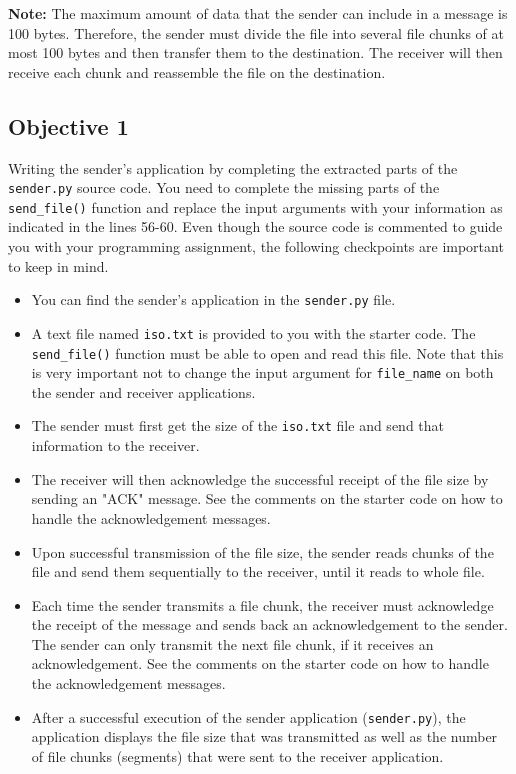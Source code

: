\documentclass[11pt]{article}
\begin{document}
\textbf{Note:}
The maximum amount of data that the sender can include in a message is 100 bytes. Therefore, the sender must divide the file into several file chunks of at most 100 bytes and then transfer them to the destination. The receiver will then receive each chunk and reassemble the file on the destination.


\subsection{Objective 1}
\label{subsec:obj1}
Writing the sender's application by completing the extracted parts of the \texttt{sender.py} source code. You need to complete the missing parts of the \texttt{send\_file()} function and replace the input arguments with your information as indicated in the lines 56-60. Even though the source code is commented to guide you with your programming assignment, the following checkpoints are important to keep in mind.
\begin{itemize}
    \item You can find the sender's application in the \texttt{sender.py} file.
    \item A text file named \texttt{iso.txt} is provided to you with the starter code. The \texttt{send\_file()} function must be able to open and read this file. Note that this is very important not to change the input argument for \texttt{file\_name} on both the sender and receiver applications.
    \item The sender must first get the size of the \texttt{iso.txt} file and send that information to the receiver.
    \item The receiver will then acknowledge the successful receipt of the file size by sending an "ACK" message. See the comments on the starter code on how to handle the acknowledgement messages.
    \item Upon successful transmission of the file size, the sender reads chunks of the file and send them sequentially to the receiver, until it reads to whole file.
    \item Each time the sender transmits a file chunk, the receiver must acknowledge the receipt of the message and sends back an acknowledgement to the sender. The sender can only transmit the next file chunk, if it receives an acknowledgement. See the comments on the starter code on how to handle the acknowledgement messages.
    \item After a successful execution of the sender application (\texttt{sender.py}), the application displays the file size that was transmitted as well as the number of file chunks (segments) that were sent to the receiver application.
\end{itemize}
\end{document}
